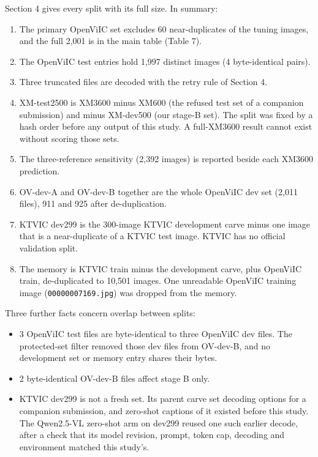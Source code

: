\documentclass[manuscript,screen]{acmart}
\providecommand{\tightlist}{\setlength{\itemsep}{0pt}\setlength{\parskip}{0pt}}
\begin{document}
Section 4 gives every split with its full size. In summary:

\begin{enumerate}
\def\labelenumi{\arabic{enumi}.}
\tightlist
\item
  The primary OpenViIC set excludes 60 near-duplicates of the tuning images, and the full 2,001 is
  in the main table (Table 7).
\item
  The OpenViIC test entries hold 1,997 distinct images (4 byte-identical pairs).
\item
  Three truncated files are decoded with the retry rule of Section 4.
\item
  XM-test2500 is XM3600 minus XM600 (the refused test set of a companion submission) and minus
  XM-dev500 (our stage-B set). The split was fixed by a hash order before any output of this study.
  A full-XM3600 result cannot exist without scoring those sets.
\item
  The three-reference sensitivity (2,392 images) is reported beside each XM3600 prediction.
\item
  OV-dev-A and OV-dev-B together are the whole OpenViIC dev set (2,011 files), 911 and 925 after
  de-duplication.
\item
  KTVIC dev299 is the 300-image KTVIC development carve minus one image that is a near-duplicate of
  a KTVIC test image. KTVIC has no official validation split.
\item
  The memory is KTVIC train minus the development carve, plus OpenViIC train, de-duplicated to
  10,501 images. One unreadable OpenViIC training image (\texttt{00000007169.jpg}) was dropped from
  the memory.
\end{enumerate}

Three further facts concern overlap between splits:

\begin{itemize}
\tightlist
\item
  3 OpenViIC test files are byte-identical to three OpenViIC dev files. The protected-set filter
  removed those dev files from OV-dev-B, and no development set or memory entry shares their bytes.
\item
  2 byte-identical OV-dev-B files affect stage B only.
\item
  KTVIC dev299 is not a fresh set. Its parent carve set decoding options for a companion submission,
  and zero-shot captions of it existed before this study. The Qwen2.5-VL zero-shot arm on dev299
  reused one such earlier decode, after a check that its model revision, prompt, token cap, decoding
  and environment matched this study's.
\end{itemize}
\end{document}
